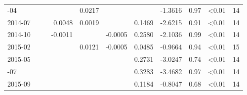\begin{table}
\begin{tabular}[t]{lrrrrrrrrlr}
\addlinespace
2014-04 &  &  &  & 0.0217 &  &  & -1.3616 & 0.97 & \textless0.01 & 14\\
2014-07 &  &  & 0.0048 & 0.0019 &  & 0.1469 & -2.6215 & 0.91 & \textless0.01 & 14\\
2014-10 &  &  & -0.0011 &  & -0.0005 & 0.2580 & -2.1036 & 0.99 & \textless0.01 & 14\\
2015-02 &  &  &  & 0.0121 & -0.0005 & 0.0485 & -0.9664 & 0.94 & \textless0.01 & 15\\
2015-05 &  &  &  &  &  & 0.2731 & -3.0247 & 0.74 & \textless0.01 & 14\\
\addlinespace
2015-07 &  &  &  &  &  & 0.3283 & -3.4682 & 0.97 & \textless0.01 & 14\\
2015-09 &  &  &  &  &  & 0.1184 & -0.8047 & 0.68 & \textless0.01 & 14\\
\bottomrule
\end{tabular}
\end{table}
